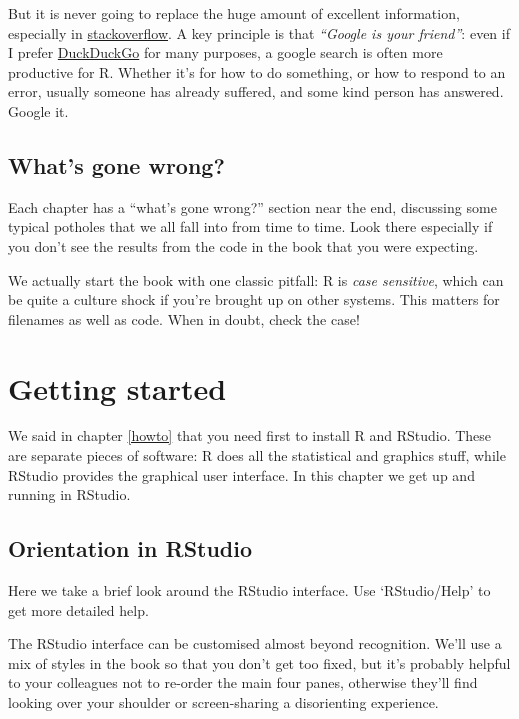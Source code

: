 \documentclass[
]{book}
\begin{document}
But it is never going to replace the huge amount of excellent information, especially in \href{https://stackoverflow.com/}{stackoverflow}. A key principle is that \emph{``Google is your friend''}: even if I prefer \href{https://www.duckduckgo.com}{DuckDuckGo} for many purposes, a google search is often more productive for R. Whether it's for how to do something, or how to respond to an error, usually someone has already suffered, and some kind person has answered. Google it.

\hypertarget{whats-gone-wrong}{%
\section{What's gone wrong?}\label{whats-gone-wrong}}

Each chapter has a ``what's gone wrong?'' section near the end, discussing some typical potholes that we all fall into from time to time. Look there especially if you don't see the results from the code in the book that you were expecting.

We actually start the book with one classic pitfall: R is \emph{case sensitive}, which can be quite a culture shock if you're brought up on other systems. This matters for filenames as well as code. When in doubt, check the case!

\hypertarget{start}{%
\chapter{Getting started}\label{start}}

We said in chapter \ref{howto} that you need first to install R and RStudio. These are separate pieces of software: R does all the statistical and graphics stuff, while RStudio provides the graphical user interface. In this chapter we get up and running in RStudio.

\hypertarget{rstudio}{%
\section{Orientation in RStudio}\label{rstudio}}

Here we take a brief look around the RStudio interface. Use `RStudio/Help' to get more detailed help.

The RStudio interface can be customised almost beyond recognition. We'll use a mix of styles in the book so that you don't get too fixed, but it's probably helpful to your colleagues not to re-order the main four panes, otherwise they'll find looking over your shoulder or screen-sharing a disorienting experience.
\end{document}
